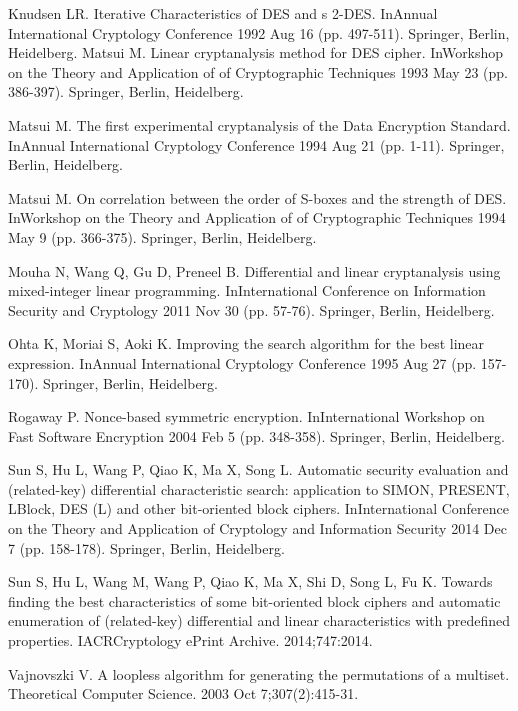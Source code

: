 \begin{thebibliography}{8}
Knudsen LR. Iterative Characteristics of DES and s 2-DES. InAnnual International Cryptology Conference 1992 Aug 16 (pp. 497-511). Springer, Berlin, Heidelberg.
Matsui M. Linear cryptanalysis method for DES cipher. InWorkshop on the Theory and Application of of Cryptographic Techniques 1993 May 23 (pp. 386-397). Springer, Berlin, Heidelberg.

Matsui M. The first experimental cryptanalysis of the Data Encryption Standard. InAnnual International Cryptology Conference 1994 Aug 21 (pp. 1-11). Springer, Berlin, Heidelberg.

Matsui M. On correlation between the order of S-boxes and the strength of DES. InWorkshop on the Theory and Application of of Cryptographic Techniques 1994 May 9 (pp. 366-375). Springer, Berlin, Heidelberg.

Mouha N, Wang Q, Gu D, Preneel B. Differential and linear cryptanalysis using mixed-integer linear programming. InInternational Conference on Information Security and Cryptology 2011 Nov 30 (pp. 57-76). Springer, Berlin, Heidelberg.

Ohta K, Moriai S, Aoki K. Improving the search algorithm for the best linear expression. InAnnual International Cryptology Conference 1995 Aug 27 (pp. 157-170). Springer, Berlin, Heidelberg.

Rogaway P. Nonce-based symmetric encryption. InInternational Workshop on Fast Software Encryption 2004 Feb 5 (pp. 348-358). Springer, Berlin, Heidelberg.

Sun S, Hu L, Wang P, Qiao K, Ma X, Song L. Automatic security evaluation and (related-key) differential characteristic search: application to SIMON, PRESENT, LBlock, DES (L) and other bit-oriented block ciphers. InInternational Conference on the Theory and Application of Cryptology and Information Security 2014 Dec 7 (pp. 158-178). Springer, Berlin, Heidelberg.

Sun S, Hu L, Wang M, Wang P, Qiao K, Ma X, Shi D, Song L, Fu K. Towards finding the best characteristics of some bit-oriented block ciphers and automatic enumeration of (related-key) differential and linear characteristics with predefined properties. IACRCryptology ePrint Archive. 2014;747:2014.

Vajnovszki V. A loopless algorithm for generating the permutations of a multiset. Theoretical Computer Science. 2003 Oct 7;307(2):415-31.


\end{thebibliography}
